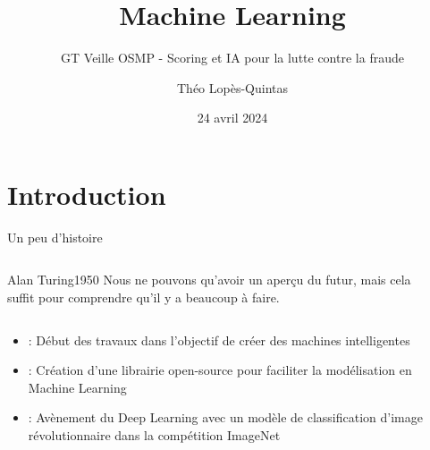 \documentclass{beamer}
\title[Machine Learning pour la lutte contre la fraude - GT Veille OSMP]{Machine Learning}
\subtitle{GT Veille OSMP - Scoring et IA pour la lutte contre la fraude}
\author[]{Théo Lopès-Quintas}
\institute{BPCE Payment Services}
\date{24 avril 2024}
\begin{document}
{
\begin{frame}
	\titlepage
\end{frame}
}
\addtocounter{framenumber}{-1}



{
\begin{frame}
	\tableofcontents
\end{frame}
}
\addtocounter{framenumber}{-1}

\AtBeginSection[]
{
    \begin{frame}
        \frametitle{}
        \tableofcontents[currentsection]
    \end{frame}
}


\section{Introduction}

\begin{frame}{}{Un peu d'histoire}

	\begin{columns}
		\begin{column}{0.7\textwidth}
			\begin{customquote}{Alan Turing}{1950}
				Nous ne pouvons qu’avoir un aperçu du futur, mais cela suffit pour comprendre qu’il y a
beaucoup à faire.
			\end{customquote}
		\end{column}
		\begin{column}{0.3\textwidth}
		\end{column}
	\end{columns}
	
	\begin{itemize}
		\item {} : Début des travaux dans l'objectif de créer des machines intelligentes
		\item {} : Création d'une librairie open-source pour faciliter la modélisation en Machine Learning
		\item {} : Avènement du Deep Learning avec un modèle de classification d'image révolutionnaire dans la compétition ImageNet
	\end{itemize}
\end{frame}
\end{document}
